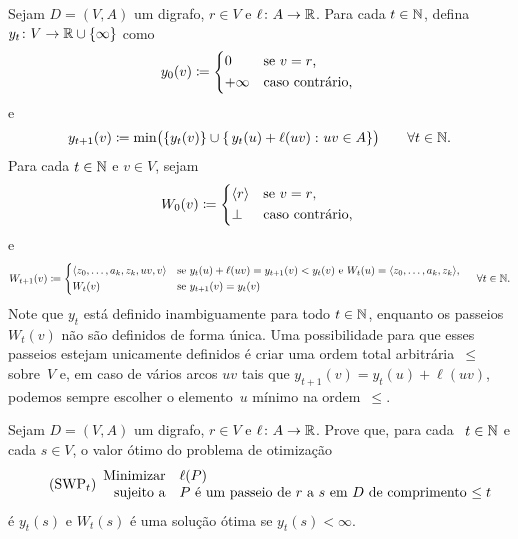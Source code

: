 \documentclass[10pt,reqno]{amsart}
\begin{document}
Sejam \(D = (V,A)\) um digrafo, \(r \in V\) e
\(\ell \colon A \to \mathbb{R}\).  Para cada \(t \in \mathbb{N}\), defina
\(y_t \colon V \to \mathbb{R} \cup \{\infty\}\) como
\begin{equation}
  \label{eq:7}
  y_0(v)
  \coloneqq
  \begin{cases*}
    0       & se \(v = r\),   \\
    +\infty & caso contrário, \\
  \end{cases*}
\end{equation}
e
\begin{equation}
  \label{eq:8}
  y_{t+1}(v)
  \coloneqq
  \min\paren[\big]{
    \set{y_t(v)}
    \cup
    \setst{
      y_t(u) + \ell(uv)
    }{
      uv \in A
    }}
  \qquad
  \forall t \in \Naturals.
\end{equation}
Para cada \(t \in \mathbb{N}\) e \(v \in V\), sejam
\begin{equation}
  \label{eq:9}
  W_0(v)
  \coloneqq
  \begin{cases*}
    \seq{r} & se \(v = r\),   \\
    \bot    & caso contrário, \\
  \end{cases*}
\end{equation}
e
\begin{equation}
  \label{eq:10}
  W_{t+1}(v)
  \coloneqq
  \begin{cases*}
    \seq{z_0,\dotsc,a_k,z_k,uv,v} & se \(y_t(u) + \ell(uv) =
    y_{t+1}(v) < y_t(v)\) e \(W_t(u) = \seq{z_0,\dotsc,a_k,z_k}\), \\
    W_t(v) & se \(y_{t+1}(v) = y_t(v)\) \\
  \end{cases*}
  \quad
  \forall t \in \Naturals.
\end{equation}
Note que \(y_t\) está definido inambiguamente para todo
\(t \in \mathbb{N}\), enquanto os passeios \(W_t(v)\) não são definidos
de forma única.  Uma possibilidade para que esses passeios estejam
unicamente definidos é criar uma ordem total arbitrária~\(\leq\)
sobre~\(V\) e, em caso de vários arcos \(uv\) tais que
\(y_{t+1}(v) = y_t(u) + \ell(uv)\), podemos sempre escolher o
elemento~\(u\) mínimo na ordem~\(\leq\).

\begin{exercise}
  \label{ex:5}
  Sejam \(D = (V,A)\) um digrafo, \(r \in V\) e
  \(\ell \colon A \to \mathbb{R}\).  Prove que, para cada
  \(t \in \mathbb{N}\) e cada \(s \in V\), o valor ótimo do problema de
  otimização
  \begin{equation}
    \tag{SWP\({}_t\)}
    \begin{array}{{rl}}
      \text{Minimizar}   & \ell(P) \\
      \text{sujeito a} & \text{\(P\) é um passeio de \(r\) a \(s\) em~\(D\) de comprimento \(\leq t\)} \\
    \end{array}
  \end{equation}
  é \(y_t(s)\) e \(W_t(s)\) é uma solução ótima se
  \(y_t(s) < \infty\).
\end{exercise}
\end{document}

